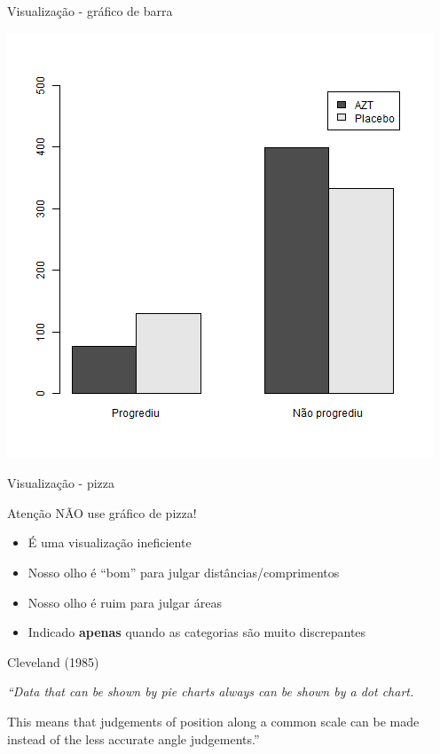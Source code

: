 \documentclass{beamer}
\begin{document}
\begin{frame}{Visualização - gráfico de barra}
  \begin{center}
    \includegraphics[height=\textheight]{Cap26-27/barplot}
  \end{center}
\end{frame}

\begin{frame}{Visualização - pizza}
  \begin{block}{Atenção}
    NÃO use gráfico de pizza!
  \end{block}
  \begin{itemize}
    \footnotesize
  \item É uma visualização ineficiente
  \item Nosso olho é ``bom'' para julgar distâncias/comprimentos
  \item Nosso olho é ruim para julgar áreas
  \item Indicado {\bf apenas} quando as categorias são muito discrepantes
  \end{itemize}
  \begin{block}{Cleveland (1985)}
    \small
    {\em ``Data that can be shown by pie charts always can be shown by a dot chart.

      This means that judgements of position along a common scale can be made instead of the less accurate angle judgements.''}
  \end{block}
\end{frame}
\end{document}

